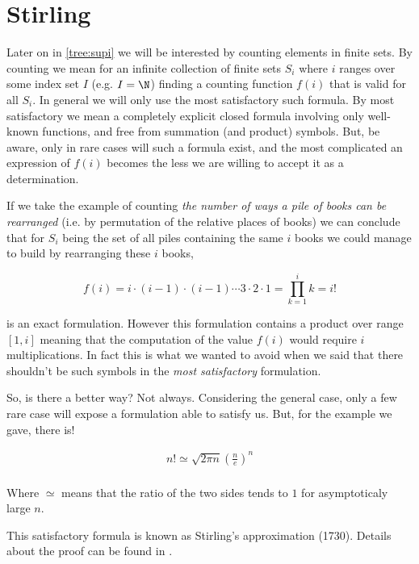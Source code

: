 \section{Stirling}
\label{tree:sorting:stirling}

Later on in \ref{tree:supi} we will be interested by counting elements in
finite sets. By counting we mean for an infinite collection of finite sets
$S_i$ where $i$ ranges over some index set $I$ (e.g. $I = \N$) finding a
counting function $f(i)$ that is valid for all $S_i$. In general we will only
use the most satisfactory such formula. By most satisfactory we mean a
completely explicit closed formula involving only well-known functions, and
free from summation (and product) symbols. But, be aware, only in rare cases
will such a formula exist, and the most complicated an expression of $f(i)$
becomes the less we are willing to accept it as a determination.
\cite{Stanley:2011:ECV:2124415}

If we take the example of counting \emph{the number of ways a pile of books can
be rearranged} (i.e. by permutation of the relative places of books) we can
conclude that for $S_i$ being the set of all piles containing the same $i$
books we could manage to build by rearranging these $i$ books,

$$ f(i) = i \cdot (i-1) \cdot (i-1) \cdots 3 \cdot 2 \cdot 1 = \prod_{k=1}^i k = i! $$

is an exact formulation. However this formulation contains a product over range
$[1, i]$ meaning that the computation of the value $f(i)$ would require $i$
multiplications. In fact this is what we wanted to avoid when we said that
there shouldn't be such symbols in the \emph{most satisfactory} formulation.

So, is there a better way? Not always. Considering the general case, only a few
rare case will expose a formulation able to satisfy us. But, for the example we
gave, there is!


\begin{theorem}
\label{tree:sorting:theorem/stirling}
\begin{align*}
n! \simeq \sqrt{2 \pi n} \left(\frac{n}{e}\right)^n\\
\end{align*}
\end{theorem}


Where $\simeq$ means that the ratio of the two sides tends to $1$ for
asymptoticaly large $n$.

This satisfactory formula is known as Stirling's approximation (1730). Details
about the proof can be found in \cite{feller1967direct}.

